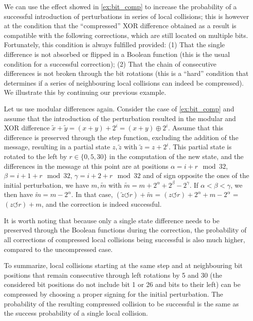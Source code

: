 We can use the effect showed in \autoref{ex:bit_comp} to increase the probability of a successful introduction of perturbations in series of local collisions; this is however at the condition that
the ``compressed'' XOR difference obtained as a result is compatible with the following corrections, which are still located on multiple bits. Fortunately, this condition is always fulfilled
provided: (1) That the single difference is not absorbed or flipped in a Boolean function (this is the usual condition for a successful correction); (2) That the chain of consecutive differences
is not broken through the bit rotations (this is a ``hard'' condition that determines if a series of neighbouring local collisions can indeed be compressed). We illustrate this by continuing
our previous example.

\begin{example}
\label{ex:bit_comp2}
Let us use modular differences again. Consider the case of \autoref{ex:bit_comp} and assume that the introduction of the perturbation resulted in the modular and XOR difference
$\widetilde{x} + \widetilde{y} = (x + y) + 2^{i}  = (x + y) \oplus 2^{i}$. Assume that this difference is preserved through the step function, excluding the addition of the message,
resulting in a partial state $z, \widetilde{z}$ with $\widetilde{z} = z + 2^{i}$. This partial state is rotated to the left by $r \in \{0, 5, 30\}$ in the computation of the new state,
and the differences in the message at this point are at positions $\alpha = i + r\mod32$, $\beta = i+1+r \mod 32$, $\gamma = i+2+r \mod 32$ and of sign opposite the ones of the initial perturbation,
\ie we have $m, \widetilde{m}$ with $\widetilde{m} = m + 2^{\alpha} + 2^{\beta} - 2^{\gamma}$. If $\alpha < \beta < \gamma$, we then have $\widetilde{m} = m - 2^{\alpha}$. In that case,
$(\widetilde{z} \circlearrowleft r) + \widetilde{m}$ = $(z \circlearrowleft r) + 2^{\alpha} + m - 2^{\alpha}$ = $(z \circlearrowleft r) + m$, and the correction is indeed successful.
\end{example}

It is worth noting that because only a single state difference needs to be preserved through the Boolean functions during the correction, the probability of all corrections of compressed
local collisions being successful is also much higher, compared to the uncompressed case.

To summarize, local collisions starting at the same step and at neighbouring bit positions that remain consecutive through left rotations by 5 and 30 (\ie the considered bit positions
do not include bit 1 or 26 and bits to their left) can be compressed by choosing a proper signing for the initial perturbation. The probability of the resulting compressed collision
to be successful is the same as the success probability of a single local collision.

